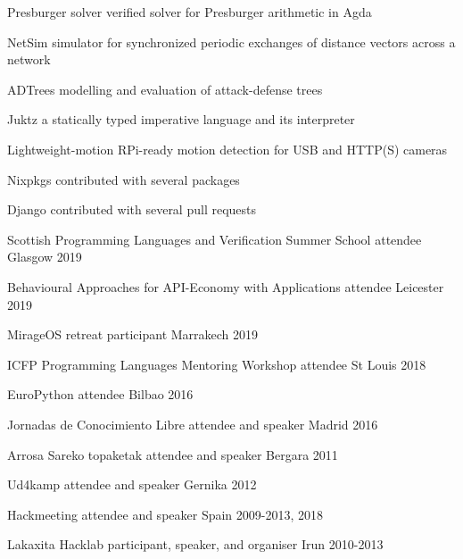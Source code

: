 \documentclass[11pt, a4paper]{awesome-cv}
\begin{document}

\begin{cvskills}
    \cvskill
        {Presburger solver}
        {verified solver for Presburger arithmetic in Agda}

    \cvskill
        {NetSim}
        {simulator for synchronized periodic exchanges of distance vectors
        across a network}

    \cvskill
        {ADTrees}
        {modelling and evaluation of attack-defense trees}

    \cvskill
        {Juktz}
        {a statically typed imperative language and its interpreter}

    \cvskill
        {Lightweight-motion}
        {RPi-ready motion detection for USB and HTTP(S) cameras}

    \cvskill
        {Nixpkgs}
        {contributed with several packages}

    \cvskill
        {Django}
        {contributed with several pull requests}
\end{cvskills}


\begin{cvhonors}
    \cvhonor
      {Scottish Programming Languages and Verification Summer School}
      {attendee}
      {Glasgow}
      {2019}

    \cvhonor
      {Behavioural Approaches for API-Economy with Applications}
      {attendee}
      {Leicester}
      {2019}

    \cvhonor
      {MirageOS retreat}
      {participant}
      {Marrakech}
      {2019}

    \cvhonor
      {ICFP}
      {Programming Languages Mentoring Workshop attendee}
      {St Louis}
      {2018}

    \cvhonor
      {EuroPython}
      {attendee}
      {Bilbao}
      {2016}

    \cvhonor
      {Jornadas de Conocimiento Libre}
      {attendee and speaker}
      {Madrid}
      {2016}

    \cvhonor
      {Arrosa Sareko topaketak}
      {attendee and speaker}
      {Bergara}
      {2011}

    \cvhonor
      {Ud4kamp}
      {attendee and speaker}
      {Gernika}
      {2012}

    \cvhonor
      {Hackmeeting}
      {attendee and speaker}
      {Spain}
      {2009-2013, 2018}
  
    \cvhonor
      {Lakaxita Hacklab}
      {participant, speaker, and organiser}
      {Irun}
      {2010-2013}
\end{cvhonors}
\end{document}
